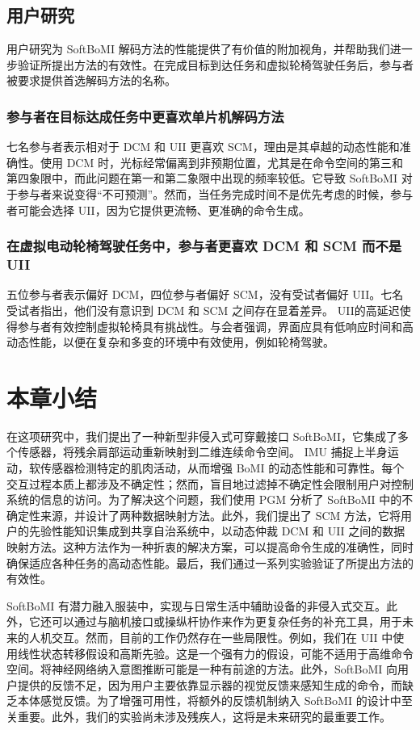 \subsection{用户研究}    用户研究为 SoftBoMI 解码方法的性能提供了有价值的附加视角，并帮助我们进一步验证所提出方法的有效性。在完成目标到达任务和虚拟轮椅驾驶任务后，参与者被要求提供首选解码方法的名称。  

\subsubsection{参与者在目标达成任务中更喜欢单片机解码方法  }    七名参与者表示相对于 DCM 和 UII 更喜欢 SCM，理由是其卓越的动态性能和准确性。使用 DCM 时，光标经常偏离到非预期位置，尤其是在命令空间的第三和第四象限中，而此问题在第一和第二象限中出现的频率较低。它导致 SoftBoMI 对于参与者来说变得“不可预测”。然而，当任务完成时间不是优先考虑的时候，参与者可能会选择 UII，因为它提供更流畅、更准确的命令生成。  

\subsubsection{在虚拟电动轮椅驾驶任务中，参与者更喜欢 DCM 和 SCM 而不是 UII  }    五位参与者表示偏好 DCM，四位参与者偏好 SCM，没有受试者偏好 UII。七名受试者指出，他们没有意识到 DCM 和 SCM 之间存在显着差异。 UII的高延迟使得参与者有效控制虚拟轮椅具有挑战性。与会者强调，界面应具有低响应时间和高动态性能，以便在复杂和多变的环境中有效使用，例如轮椅驾驶。

 \section{本章小结}    在这项研究中，我们提出了一种新型非侵入式可穿戴接口 SoftBoMI，它集成了多个传感器，将残余肩部运动重新映射到二维连续命令空间。 IMU 捕捉上半身运动，软传感器检测特定的肌肉活动，从而增强 BoMI 的动态性能和可靠性。每个交互过程本质上都涉及不确定性；然而，盲目地过滤掉不确定性会限制用户对控制系统的信息的访问。为了解决这个问题，我们使用 PGM 分析了 SoftBoMI 中的不确定性来源，并设计了两种数据映射方法。此外，我们提出了 SCM 方法，它将用户的先验性能知识集成到共享自治系统中，以动态仲裁 DCM 和 UII 之间的数据映射方法。这种方法作为一种折衷的解决方案，可以提高命令生成的准确性，同时确保适应各种任务的高动态性能。最后，我们通过一系列实验验证了所提出方法的有效性。  

SoftBoMI 有潜力融入服装中，实现与日常生活中辅助设备的非侵入式交互。此外，它还可以通过与脑机接口或操纵杆协作来作为更复杂任务的补充工具，用于未来的人机交互。然而，目前的工作仍然存在一些局限性。例如，我们在 UII 中使用线性状态转移假设和高斯先验。这是一个强有力的假设，可能不适用于高维命令空间。将神经网络纳入意图推断可能是一种有前途的方法。此外，SoftBoMI 向用户提供的反馈不足，因为用户主要依靠显示器的视觉反馈来感知生成的命令，而缺乏本体感觉反馈。为了增强可用性，将额外的反馈机制纳入 SoftBoMI 的设计中至关重要。此外，我们的实验尚未涉及残疾人，这将是未来研究的最重要工作。  
